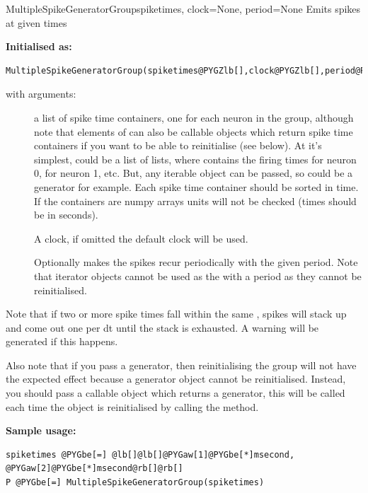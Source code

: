 \documentclass[letterpaper,10pt,english]{manual}
\begin{document}
\hypertarget{brian.MultipleSpikeGeneratorGroup}{}\begin{classdesc}{MultipleSpikeGeneratorGroup}{spiketimes, clock=None, period=None}
Emits spikes at given times

\textbf{Initialised as:}

\begin{Verbatim}[commandchars=@\[\]]
MultipleSpikeGeneratorGroup(spiketimes@PYGZlb[],clock@PYGZlb[],period@PYGZrb[]@PYGZrb[])
\end{Verbatim}

with arguments:
\begin{description}
\item[]
a list of spike time containers, one for each neuron in the group,
although note that elements of  can also be callable objects which
return spike time containers if you want to be able to reinitialise (see below).
At it's simplest,  could be a list of lists, where  contains
the firing times for neuron 0,  for neuron 1, etc. But, any iterable
object can be passed, so  could be a generator for example. Each
spike time container should be sorted in time. If the containers are numpy arrays units
will not be checked (times should be in seconds).

\item[]
A clock, if omitted the default clock will be used.

\item[]
Optionally makes the spikes recur periodically with the given
period. Note that iterator objects cannot be used as the 
with a period as they cannot be reinitialised.

\end{description}

Note that if two or more spike times fall within the same , spikes will stack up
and come out one per dt until the stack is exhausted. A warning will be generated
if this happens.

Also note that if you pass a generator, then reinitialising the group will not have the
expected effect because a generator object cannot be reinitialised. Instead, you should
pass a callable object which returns a generator, this will be called each time the
object is reinitialised by calling the  method.

\textbf{Sample usage:}

\begin{Verbatim}[commandchars=@\[\]]
spiketimes @PYGbe[=] @lb[]@lb[]@PYGaw[1]@PYGbe[*]msecond, @PYGaw[2]@PYGbe[*]msecond@rb[]@rb[]
P @PYGbe[=] MultipleSpikeGeneratorGroup(spiketimes)
\end{Verbatim}
\end{classdesc}
\end{document}
